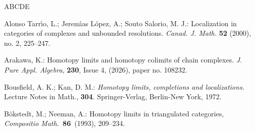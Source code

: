 \documentclass[reqno,11pt]{amsart}
\theoremstyle{plain}
\theoremstyle{remark}
\theoremstyle{definition}
\numberwithin{equation}{thm}
\begin{document}
\begin{thebibliography}{ABCDE}
		
		
 Alonso Tarr{\'{\i}}o, L.; Jerem{\'{\i}}as L{\'o}pez, A.; Souto Salorio, M. J.:
Localization in categories of complexes and unbounded resolutions. \textit{Canad. J. Math.} \textbf{52} (2000), no. 2,  225--247.

 Arakawa, K.:
Homotopy limits and homotopy colimits of chain complexes. \textit{J. Pure Appl. Algebra}, \textbf{230}, Issue 4, (2026), paper no. 108232.
		
		
 Bousfield, A. K.; Kan, D. M.:
\textit{Homotopy limits, completions and localizations.} Lecture Notes in Math., \textbf{304}. Springer-Verlag, Berlin-New York, 1972.

		
		
 B\"okstedt, M.; Neeman, A.: 
Homotopy limits in triangulated categories, {\it Compositio Math.\ }{\bf 86}~(1993),
		209--234.
		
		
		
		
		

\end{thebibliography}
\end{document}
